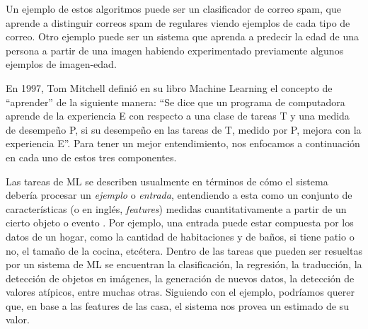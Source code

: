 \documentclass[../../main.tex]{subfiles}
\begin{document}
Un ejemplo de estos algoritmos puede ser un clasificador de correo spam, que aprende a
distinguir correos spam de regulares viendo ejemplos de cada tipo de correo. Otro ejemplo
puede ser un sistema que aprenda a predecir la edad de una persona a partir de una imagen
habiendo experimentado previamente algunos ejemplos de imagen-edad.

En 1997, Tom Mitchell definió en su libro Machine Learning \cite{ml-tom-mitchell} el
concepto de ``aprender'' de la siguiente manera: ``Se dice que un programa de computadora
aprende de la experiencia E con respecto a una clase de tareas T y una medida de desempeño
P, si su desempeño en las tareas de T, medido por P, mejora con la experiencia E''. Para
tener un mejor entendimiento, nos enfocamos a continuación en cada uno de estos tres
componentes.

Las tareas de ML se describen usualmente en términos de cómo el sistema debería procesar
un \textit{ejemplo} o \textit{entrada}, entendiendo a esta como un conjunto de
características (o en inglés, \textit{features}) medidas cuantitativamente a partir de un
cierto objeto o evento \cite{deep-learning}. Por ejemplo, una entrada puede estar
compuesta por los datos de un hogar, como la cantidad de habitaciones y de baños, si tiene
patio o no, el tamaño de la cocina, etcétera. Dentro de las tareas que pueden ser
resueltas por un sistema de ML se encuentran la clasificación, la regresión, la
traducción, la detección de objetos en imágenes, la generación de nuevos datos, la
detección de valores atípicos, entre muchas otras. Siguiendo con el ejemplo, podríamos
querer que, en base a las features de las casa, el sistema nos provea un estimado
de su valor.
\end{document}
